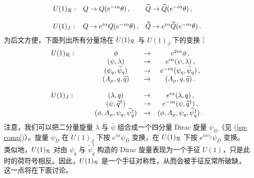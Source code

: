 \begin{equation}
\begin{array}{lll}
U(1)_{\cal R}: &Q \rightarrow Q(e^{-i\alpha}\theta)\,,
& \widetilde Q \rightarrow \widetilde Q (e^{-i\alpha}\theta)\,, \\ \\
U(1)_J : &Q\rightarrow e^{i\alpha} Q(e^{-i\alpha}\theta)\,,
&\widetilde Q\rightarrow e^{i\alpha}\widetilde Q(e^{-i\alpha}\theta)\,. 
\end{array}
\label{Rb2}
\end{equation}
为后文方便，下面列出所有分量场在 $U(1)_{\cal R}$ 与 $U(1)_J$ 下的变换：
$$
\begin{array}{lccc} 
U(1)_{\cal R}:\qquad & \phi &\rightarrow & e^{2i\alpha}\phi\,, \\
&(\psi,\lambda)&\rightarrow & e^{i\alpha}(\psi,\lambda)\,, \\
&(\psi_q,\widetilde\psi_q)&\rightarrow &e^{-i\alpha} 
(\psi_q,\widetilde\psi_q)\,, \\
&(A_\mu, q, \widetilde q)&\rightarrow & (A_\mu, q, \widetilde q)\,.
\\ \\
U(1)_J: &(\lambda, q)&\rightarrow & e^{i\alpha}(\lambda, q)\,,\\
&(\psi,\widetilde q^\dagger)&\rightarrow & e^{-i\alpha}
(\psi,\widetilde q^\dagger)\,,\\
&(\phi, A_\mu, \psi_q,\widetilde\psi_q^\dagger)&\rightarrow &
(\phi, A_\mu, \psi_q,\widetilde\psi_q^\dagger)\,.
\end{array}
$$
注意，我们可以把二分量旋量 $\lambda$ 与 $\bar\psi$ 组合成一个四分量 Dirac 旋量 $\psi_D$（见 (\ref{sp-comp})）。旋量 $\psi_D$ 在 $U(1)_J$ 下按 $e^{i\alpha}\psi_D$ 变换，在 $U(1)_{\cal R}$ 下按 $e^{i\alpha\gamma_5}\psi_D$ 变换。类似地，$U(1)_{\cal R}$ 对由 $\psi_q$ 与 $\widetilde\psi_q^\dagger$ 构造的 Dirac 旋量表现为一个手征 $U(1)$，只是此时的荷符号相反。因此，$U(1)_{\cal R}$ 是一个手征对称性，从而会被手征反常所破缺，这一点将在下面讨论。


